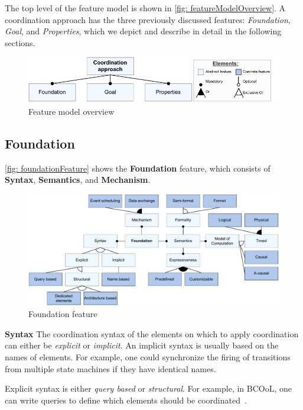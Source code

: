 \documentclass[runningheads]{llncs}
\newcommand{\feature}[1]{\textbf{#1}}
\begin{document}
The top level of the feature model is shown in \autoref{fig: featureModelOverview}.
A coordination approach has the three previously discussed features: \textit{Foundation}, \textit{Goal}, and \textit{Properties}, which we depict and describe in detail in the following sections.

\begin{figure}[ht]
	\centering
	\includegraphics[width=1\textwidth]{images/root}
	\caption{Feature model overview}
	\label{fig: featureModelOverview}
\end{figure}

\subsection{Foundation}

\autoref{fig: foundationFeature} shows the \textbf {Foundation} feature, which consists of \textbf{Syntax}, \textbf{Semantics}, and \textbf{Mechanism}.

\begin{figure}[ht]
	\centering
	\includegraphics[width=1\textwidth]{images/foundation_feature}
	\caption{Foundation feature}
	\label{fig: foundationFeature}
\end{figure}

\feature{Syntax} The coordination syntax of the elements on which to apply coordination can either be \textit{explicit} or \textit{implicit}.
An implicit syntax is usually based on the names of elements.
For example, one could synchronize the firing of transitions from multiple state machines if they have identical names.

Explicit syntax is either \textit{query based} or \textit{structural}.
For example, in BCOoL, one can write queries to define which elements should be coordinated~\cite{varalarsenBCOolBehavioralCoordination2016,varalarsenBehavioralCoordinationOperator2015}.
\end{document}
